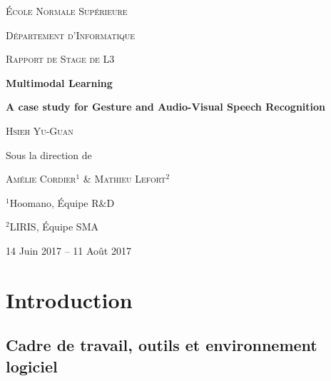 

\begin{titlepage}

  \centering

  \vspace*{1.5em}
  {\LARGE \scshape École Normale Supérieure \par}
  {\Large \scshape Département d'Informatique \par}

  {\Large \scshape Rapport de Stage de L3 \par}

  \vspace{14em}
  {\huge \bfseries Multimodal Learning \par} 
  {\Large \bfseries
    A case study for Gesture and Audio-Visual Speech Recognition \par}

  \vspace{4em}
  {\Large \scshape Hsieh Yu-Guan \par}
  
  \vspace{2em}
  {\Large Sous la direction de \par}

  \vspace{0.5em}
  {\Large \scshape Amélie Cordier$^1$ \& Mathieu Lefort$^2$ \par}

  \vspace{0.5em}
  {\large $^1$Hoomano, Équipe R\&D \par}
  {\large $^2$LIRIS, Équipe SMA \par}

  \vspace{8em}
  {\Large 14 Juin 2017 -- 11 Août 2017}

  \vfill

\end{titlepage}

\section{Introduction} \label{section:introduction}

\subsection{Cadre de travail, outils et environnement logiciel}

